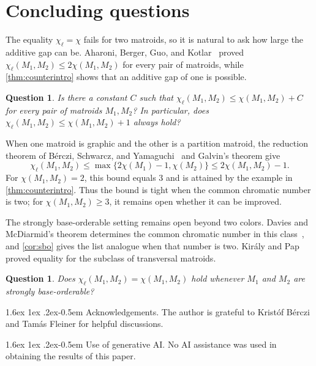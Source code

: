 \documentclass[10pt,a4paper]{article}
\makeatletter
\renewcommand{\paragraph}{%
  \@startsection{paragraph}{4}%
  {\z@}{1.6ex \@plus 1ex \@minus .2ex}{-0.5em}%
  {\normalfont\normalsize\bfseries}%
}
\theoremstyle{plain}
\newtheorem{qu}[thm]{Question}
\theoremstyle{definition}
\makeatother
\begin{document}
\section{Concluding questions}
\label{sec:open}

The equality $\chi_\ell=\chi$ fails for two matroids, so it is natural to ask how large the additive gap can be. Aharoni, Berger, Guo, and Kotlar~\cite{aharoni2025coloring} proved $\chi_\ell(M_1,M_2)\le2\chi(M_1,M_2)$ for every pair of matroids, while \cref{thm:counterintro} shows that an additive gap of one is possible.

\begin{qu}\label{qu:gap}
Is there a constant $C$ such that $\chi_\ell(M_1,M_2)\le \chi(M_1,M_2)+C$ for every pair of matroids $M_1,M_2$? In particular, does $\chi_\ell(M_1,M_2)\le \chi(M_1,M_2)+1$ always hold?
\end{qu}

When one matroid is graphic and the other is a partition matroid, the reduction theorem of B\'erczi, Schwarcz, and Yamaguchi~\cite[Theorem~1.6]{berczi2021list} and Galvin's theorem give
\[
\chi_\ell(M_1,M_2)\le \max\{2\chi(M_1)-1,\chi(M_2)\}\le2\chi(M_1,M_2)-1.
\]
For $\chi(M_1,M_2)=2$, this bound equals $3$ and is attained by the example in \cref{thm:counterintro}. Thus the bound is tight when the common chromatic number is two; for $\chi(M_1,M_2)\ge3$, it remains open whether it can be improved.

The strongly base-orderable setting remains open beyond two colors. Davies and McDiarmid's theorem determines the common chromatic number in this class~\cite{davies1976disjoint}, and \cref{cor:sbo} gives the list analogue when that number is two. Kir\'aly and Pap~\cite{kiraly2010list} proved equality for the subclass of transversal matroids.

\begin{qu}\label{qu:sbo}
Does $\chi_\ell(M_1,M_2)=\chi(M_1,M_2)$ hold whenever $M_1$ and $M_2$ are strongly base-orderable?
\end{qu}

\bigskip

\paragraph{Acknowledgements.}
The author is grateful to Kristóf Bérczi and Tamás Fleiner for helpful discussions.

\paragraph{Use of generative AI.}
No AI assistance was used in obtaining the results of this paper.




\end{document}
